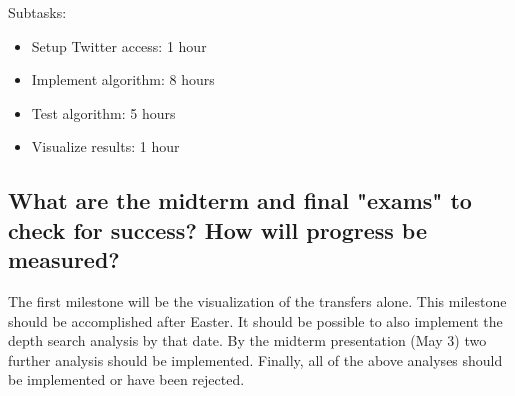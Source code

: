 \documentclass{article}
\begin{document}
Subtasks:
\begin{itemize}
\item Setup Twitter access: 1 hour
\item Implement algorithm: 8 hours
\item Test algorithm: 5 hours
\item Visualize results: 1 hour
\end{itemize}

\subsection{What are the midterm and final "exams" to check for success? How will progress be measured?}

The first milestone will be the visualization of the transfers alone. This milestone should be accomplished after Easter. It should be possible to also implement the depth search analysis by that date. By the midterm presentation (May 3) two further analysis should be implemented. Finally, all of the above analyses should be implemented or have been rejected.



\end{document}
